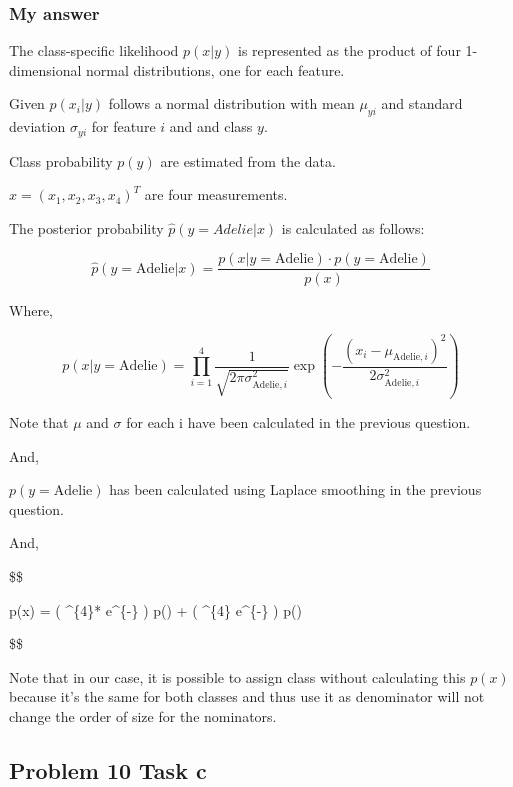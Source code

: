 \documentclass[
]{article}
\begin{document}
\hypertarget{my-answer-4}{%
\subsubsection{My answer}\label{my-answer-4}}

The class-specific likelihood \(p(x|y)\) is represented as the product
of four 1-dimensional normal distributions, one for each feature.

Given \(p(x_i|y)\) follows a normal distribution with mean \(\mu_{yi}\)
and standard deviation \(\sigma_{yi}\) for feature \(i\) and and class
\(y\).

Class probability \(p(y)\) are estimated from the data.

\(x = (x_1, x_2, x_3, x_4)^T\) are four measurements.

The posterior probability \(\hat{p}(y = Adelie| x)\) is calculated as
follows:

\[
\hat{p}(y = \text{Adelie} | x) = \frac{p(x | y = \text{Adelie}) \cdot p(y = \text{Adelie})}{p(x)}
\]

Where,

\[
p(x | y = \text{Adelie}) = \prod_{i=1}^{4} \frac{1}{\sqrt{2\pi\sigma_{\text{Adelie},i}^2}} \exp\left(-\frac{(x_i - \mu_{\text{Adelie},i})^2}{2\sigma_{\text{Adelie},i}^2}\right)
\]

Note that \(\mu\) and \(\sigma\) for each i have been calculated in the
previous question.

And,

\(p(y = \text{Adelie})\) has been calculated using Laplace smoothing in
the previous question.

And,

\$\$

p(x) = \left( \^{}\{4\}*
e\^{}\{-\}
\right) p() + \left( \^{}\{4\}
e\^{}\{-\}
\right) p()

\$\$

Note that in our case, it is possible to assign class without
calculating this \(p(x)\) because it's the same for both classes and
thus use it as denominator will not change the order of size for the
nominators.

\hypertarget{problem-10-task-c}{%
\subsection{Problem 10 Task c}\label{problem-10-task-c}}
\end{document}
